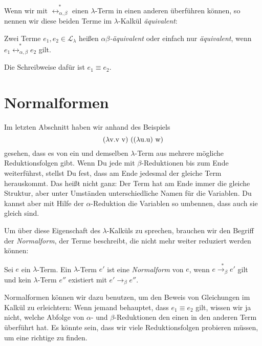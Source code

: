 Wenn wir mit $\overset{\ast}{\leftrightarrow_{\alpha,\beta}}$ einen
$\lambda$-Term in einen anderen überführen können, so nennen wir diese
beiden Terme im $\lambda$-Kalkül 
\textit{äquivalent}:
%
\begin{definition}
  Zwei Terme $e_1, e_2\in\mathcal{L}_{\lambda}$ heißen
  \textit{$\alpha\beta$-äquivalent} oder einfach nur
  \textit{äquivalent}, wenn
  \(e_1 \overset{\ast}{\leftrightarrow_{\alpha,\beta}} e_2\)
  gilt.

  Die Schreibweise dafür ist \(e_1\equiv e_2\).
\end{definition}

\section{Normalformen}
\label{sec:normalformen}


Im letzten Abschnitt haben wir anhand des Beispiels
\begin{displaymath}
(\lambda \mathrm v .\mathrm v~\mathrm v)~((\lambda \mathrm u.\mathrm u)~\mathrm w)
\end{displaymath}
%
gesehen, dass es von ein und demselben $\lambda$-Term aus mehrere
mögliche Reduktionsfolgen gibt.  Wenn Du jede mit $\beta$-Reduktionen
bis zum Ende weiterführst, stellst Du fest, dass am Ende jedesmal der
gleiche Term herauskommt.  Das heißt nicht ganz: Der Term hat am Ende
immer die gleiche Struktur, aber unter Umständen unterschiedliche
Namen für die Variablen.  Du kannst aber mit Hilfe der
$\alpha$-Reduktion die Variablen so umbennen, dass auch sie gleich sind.

Um über diese Eigenschaft des $\lambda$-Kalküls zu sprechen, brauchen
wir den Begriff der \textit{Normalform}, der Terme beschreibt, die
nicht mehr weiter reduziert werden können:
%
\begin{definition}[Normalform]
  Sei $e$ ein $\lambda$-Term.  Ein $\lambda$-Term $e'$ ist eine
  \textit{Normalform} von $e$, wenn
  $e\overset{\ast}{\rightarrow_\beta}e'$ gilt und kein $\lambda$-Term
  $e''$ existiert mit
  $e'\rightarrow_\beta e''$.
\end{definition}
%
Normalformen können wir dazu benutzen, um den Beweis von Gleichungen
im Kalkül zu erleichtern: Wenn jemand behauptet, dass $e_1 \equiv e_2$
gilt, wissen wir ja nicht, welche Abfolge von $\alpha$- und
$\beta$-Reduktionen den einen in den anderen Term überführt hat.  Es
könnte sein, dass wir viele Reduktionsfolgen probieren müssen, um eine
richtige zu finden.

